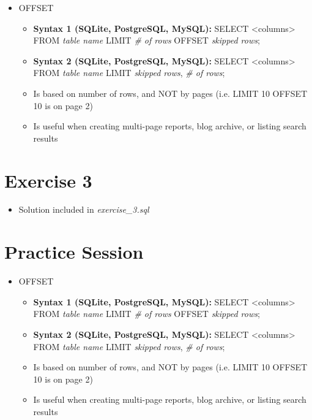 \documentclass[12pt]{article}
\begin{document}
\begin{itemize}
    \item OFFSET
    \begin{itemize}
        \item \textbf{Syntax 1 (SQLite, PostgreSQL, MySQL):} SELECT <columns> FROM \textit{table name} LIMIT \textit{\# of rows} OFFSET \textit{skipped rows};
        \item \textbf{Syntax 2 (SQLite, PostgreSQL, MySQL):} SELECT <columns> FROM \textit{table name} LIMIT \textit{skipped rows}, \textit{\# of rows};
        \item Is based on number of rows, and NOT by pages (i.e. LIMIT 10 OFFSET 10 is on page 2)
        \item Is useful when creating multi-page reports, blog archive, or listing search results
    \end{itemize}
\end{itemize}


\bigskip

\section{Exercise 3}

\bigskip

\begin{itemize}
    \item Solution included in \textit{exercise\_3.sql}
\end{itemize}


\bigskip

\section{Practice Session}

\bigskip

\begin{itemize}
    \item OFFSET
    \begin{itemize}
        \item \textbf{Syntax 1 (SQLite, PostgreSQL, MySQL):} SELECT <columns> FROM \textit{table name} LIMIT \textit{\# of rows} OFFSET \textit{skipped rows};
        \item \textbf{Syntax 2 (SQLite, PostgreSQL, MySQL):} SELECT <columns> FROM \textit{table name} LIMIT \textit{skipped rows}, \textit{\# of rows};
        \item Is based on number of rows, and NOT by pages (i.e. LIMIT 10 OFFSET 10 is on page 2)
        \item Is useful when creating multi-page reports, blog archive, or listing search results
    \end{itemize}
\end{itemize}
\end{document}
